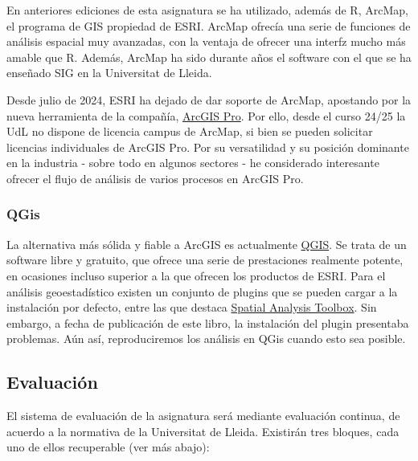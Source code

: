 \documentclass[
  letterpaper,
  DIV=11,
  numbers=noendperiod]{scrreprt}
\begin{document}
En anteriores ediciones de esta asignatura se ha utilizado, además de R,
ArcMap, el programa de GIS propiedad de ESRI. ArcMap ofrecía una serie
de funciones de análisis espacial muy avanzadas, con la ventaja de
ofrecer una interfz mucho más amable que R. Además, ArcMap ha sido
durante años el software con el que se ha enseñado SIG en la Universitat
de Lleida.

Desde julio de 2024, ESRI ha dejado de dar soporte de ArcMap, apostando
por la nueva herramienta de la compañía,
\href{https://www.esri.com/es-es/arcgis/products/arcgis-pro/overview?srsltid=AfmBOor-rlh2GqLGzdx_LmCzPqYP35N82fiTDYQXOsSUXbkYXSPNvmm7}{ArcGIS
Pro}. Por ello, desde el curso 24/25 la UdL no dispone de licencia
campus de ArcMap, si bien se pueden solicitar licencias individuales de
ArcGIS Pro. Por su versatilidad y su posición dominante en la industria
- sobre todo en algunos sectores - he considerado interesante ofrecer el
flujo de análisis de varios procesos en ArcGIS Pro.

\hypertarget{qgis}{%
\subsubsection*{QGis}\label{qgis}}

La alternativa más sólida y fiable a ArcGIS es actualmente
\href{https://www.qgis.org/}{QGIS}. Se trata de un software libre y
gratuito, que ofrece una serie de prestaciones realmente potente, en
ocasiones incluso superior a la que ofrecen los productos de ESRI. Para
el análisis geoestadístico existen un conjunto de plugins que se pueden
cargar a la instalación por defecto, entre las que destaca
\href{https://plugins.qgis.org/plugins/spatialanalysistoolbox/}{Spatial
Analysis Toolbox}. Sin embargo, a fecha de publicación de este libro, la
instalación del plugin presentaba problemas. Aún así, reproduciremos los
análisis en QGis cuando esto sea posible.

\hypertarget{evaluaciuxf3n}{%
\subsection*{Evaluación}\label{evaluaciuxf3n}}

El sistema de evaluación de la asignatura será mediante evaluación
continua, de acuerdo a la normativa de la Universitat de Lleida.
Existirán tres bloques, cada uno de ellos recuperable (ver más abajo):
\end{document}
